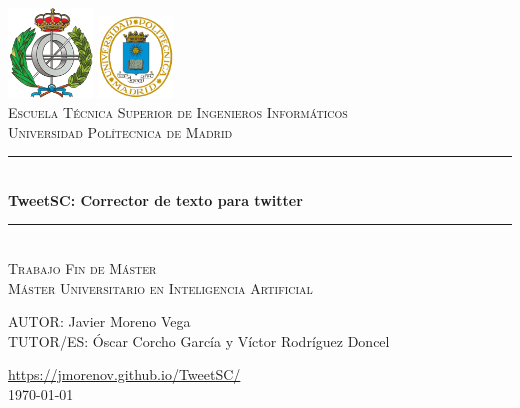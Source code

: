 \documentclass[spanish,12pt, a4paper,twoside]{paper}
\begin{document}
\begin{titlepage}

\newcommand{\HRule}{\rule{\linewidth}{0.5mm}} %

\center %
 
\includegraphics[width=2.25cm]{recursos/logoFi.png}
  \hspace{8cm}
\includegraphics[width=2cm]{recursos/logoupm.png}
\\[1cm]

\textsc{\Large Escuela Técnica Superior de Ingenieros Informáticos}\\[0.5cm]
\textsc{\large Universidad Polítecnica de Madrid}
\\[3cm]


 \HRule \\[0.4cm]
{ \huge \bfseries TweetSC: Corrector de texto para twitter}\\[0.4cm] %
\HRule \\[2.5cm]

\textsc{\LARGE Trabajo Fin de Máster}\\[0.5cm] 
\textsc{\Large Máster Universitario en Inteligencia Artificial }\\[2.5cm]

\begin{flushright}
\large
AUTOR: Javier Moreno Vega\\
TUTOR/ES: Óscar Corcho García y \linebreak
                    Víctor Rodríguez Doncel
\end{flushright}


{{\url{https://jmorenov.github.io/TweetSC/}}}\\[1cm]


{ {\today}}\\[1cm]

\vfill %

\end{titlepage}
\end{document}
